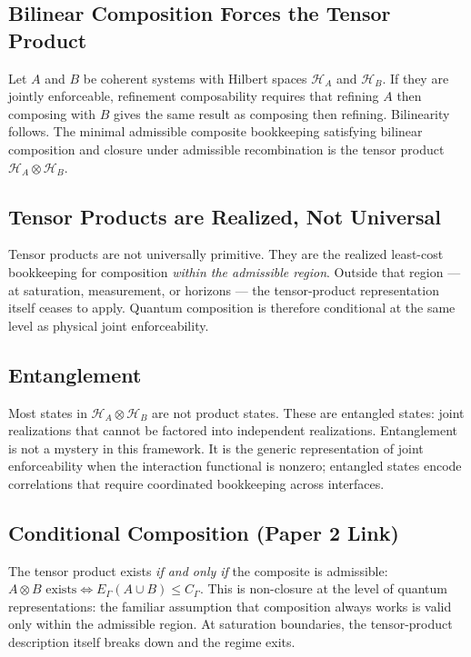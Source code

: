\documentclass[11pt]{article}
\begin{document}
\subsection{Bilinear Composition Forces the Tensor Product}
Let $A$ and $B$ be coherent systems with Hilbert spaces $\mathcal{H}_A$ and
$\mathcal{H}_B$. If they are jointly enforceable, refinement composability
requires that refining $A$ then composing with $B$ gives the same result as
composing then refining. Bilinearity follows. The minimal admissible composite
bookkeeping satisfying bilinear composition and closure under admissible
recombination is the tensor product $\mathcal{H}_A \otimes \mathcal{H}_B$.

\subsection{Tensor Products are Realized, Not Universal}
Tensor products are not universally primitive. They are the realized least-cost
bookkeeping for composition \emph{within the admissible region}. Outside that
region --- at saturation, measurement, or horizons --- the tensor-product
representation itself ceases to apply. Quantum composition is therefore
conditional at the same level as physical joint enforceability.

\subsection{Entanglement}
Most states in $\mathcal{H}_A \otimes \mathcal{H}_B$ are not product states. These
are entangled states: joint realizations that cannot be factored into independent
realizations. Entanglement is not a mystery in this framework. It is the generic
representation of joint enforceability when the interaction functional is nonzero;
entangled states encode correlations that require coordinated bookkeeping across
interfaces.

\subsection{Conditional Composition (Paper 2 Link)}
The tensor product exists \emph{if and only if} the composite is admissible:
$A \otimes B \text{ exists} \iff E_{\Gamma}(A \cup B) \le C_{\Gamma}$. This is
non-closure at the level of quantum representations: the familiar assumption that
composition always works is valid only within the admissible region. At saturation
boundaries, the tensor-product description itself breaks down and the regime
exits.
\end{document}
